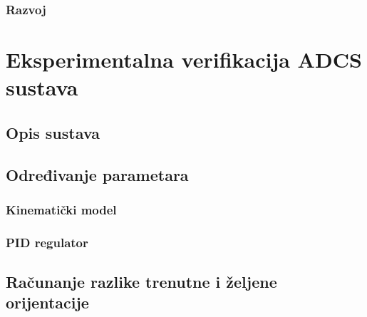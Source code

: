 \documentclass[times, utf8, diplomski, numeric]{templates/template}
\begin{document}
{{        \subsection{Razvoj}{
            \iffalse
            - objasniti koji compiler koristimo
            - objasniti koji programski jezik koristimo
            - objasniti da je cijeli kod na githubu
            - broj linija koda
                - vidi kako to dobiti u linux-u sa nekom komandom
            - objasniti koje sve alate koristimo prilikom razvoja SW
                - clang format i slicno
                - vscode
                - openocd
            - objasniti kako debugiramo
            - slikati graf razvoja programskog koda kroz vrijeme
            \fi
        }
    }
}

\chapter{Eksperimentalna verifikacija ADCS sustava}{
    \section{Opis sustava}{
        \iffalse
        - opisati zracni lezaj
        - opisati kuglu
        - opisati kako satelit stoji u kugli
        - navesti reference za zracne lezaje
        - parser
        - program za iscrtavanje
        - bluetooth modul za komunikaciju
        - iscrtavanje orijentacije papirnatog avioncica u Octave programu
        \fi
    }

    \section{Određivanje parametara}{
        \subsection{Kinematički model}{
            \iffalse
            - objasni kako smo dobili parametre
            \fi
        }
    
        \subsection{PID regulator}{
            \iffalse
            - vidi cubesat na arduinu
            - objasni kako smo dobili parametre PID regulatora
            \fi
        }
    }

    \section{Računanje razlike trenutne i željene orijentacije}{
}}
\end{document}

